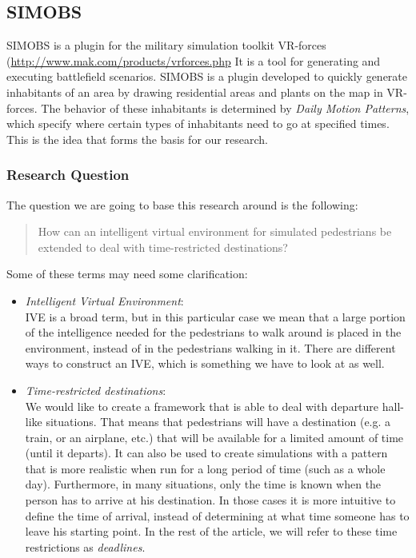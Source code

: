 \documentclass[11pt]{book}
\begin{document}
\subsection{SIMOBS}
SIMOBS is a plugin for the military simulation toolkit VR-forces (\url{http://www.mak.com/products/vrforces.php} It is a tool for generating and executing battlefield scenarios. SIMOBS is a plugin developed to quickly generate inhabitants of an area by drawing residential areas and plants on the map in VR-forces. The behavior of these inhabitants is determined by \emph{Daily Motion Patterns}, which specify where certain types of inhabitants need to go at specified times. This is the idea that forms the basis for our research.


\subsubsection{Research Question}
The question we are going to base this research around is the following:
\begin{quote}
How can an intelligent virtual environment for simulated pedestrians be extended to deal with time-restricted destinations?
\end{quote}
Some of these terms may need some clarification:
\begin{itemize}
\item \emph{Intelligent Virtual Environment}:\\
IVE is a broad term, but in this particular case we mean that a large portion of the intelligence needed for the pedestrians to walk around is placed in the environment, instead of in the pedestrians walking in it. There are different ways to construct an IVE, which is something we have to look at as well.

\item \emph{Time-restricted destinations}:\\
We would like to create a framework that is able to deal with departure hall-like situations. That means that pedestrians will have a destination (e.g. a train, or an airplane, etc.) that will be available for a limited amount of time (until it departs). It can also be used to create simulations with a pattern that is more realistic when run for a long period of time (such as a whole day). Furthermore, in many situations, only the time is known when the person has to arrive at his destination. In those cases it is more intuitive to define the time of arrival, instead of determining at what time someone has to leave his starting point. In the rest of the article, we will refer to these time restrictions as \emph{deadlines}.
\end{itemize}
\end{document}
